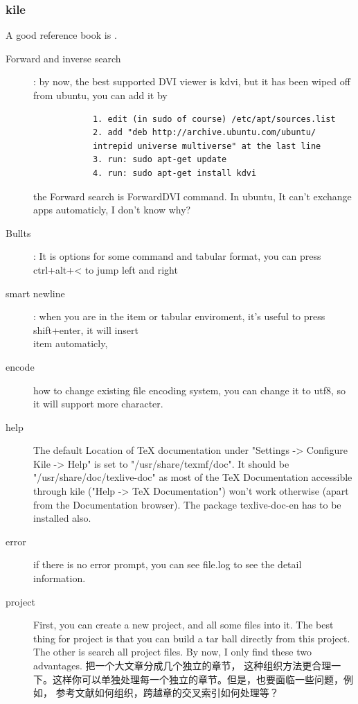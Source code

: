 \documentclass[a4paper,12pt,twoside]{book}
\begin{document}
\begin{CJK*}{UTF8}{song}
	\subsubsection{kile}
		A good reference book is \cite{Kile}.\\
		\begin{description}
			\item[Forward and inverse search]:
			by now, the best supported DVI viewer is kdvi, but it has been wiped off from ubuntu, you can add it by
			\begin{verbatim}
			1. edit (in sudo of course) /etc/apt/sources.list
			2. add "deb http://archive.ubuntu.com/ubuntu/
			intrepid universe multiverse" at the last line
			3. run: sudo apt-get update
			4. run: sudo apt-get install kdvi
			\end{verbatim}
			the Forward search is ForwardDVI command. In ubuntu, It can't exchange apps automaticly, I don't know why?
			\item[Bullts]:
			It is options for some command and tabular format, you can press ctrl+alt+< to jump left and right
			\item[smart newline]:
			when you are in the item or tabular enviroment, it's useful to press shift+enter, it will insert \\item automaticly,
			\item[encode] how to change existing file encoding system, you can change it to utf8, so it will support more character.
			\item[help]
			The default Location of TeX documentation under "Settings -> Configure Kile -> Help" is set to "/usr/share/texmf/doc". It should be "/usr/share/doc/texlive-doc" as most of the TeX Documentation accessible through kile ("Help -> TeX Documentation") won't work otherwise (apart from the Documentation browser). The package texlive-doc-en has to be installed also.
			\item[error]
			if there is no error prompt, you can see file.log to see the detail information.
			\item[project]
			First, you  can create a new project, and all some files into it. The best thing for project is that you can build a tar ball directly from this project. The other is search all project files. By now, I only find these two advantages. 把一个大文章分成几个独立的章节， 这种组织方法更合理一下。这样你可以单独处理每一个独立的章节。但是，也要面临一些问题，例如， 参考文献如何组织，跨越章的交叉索引如何处理等？
		\end{description}
	


\end{CJK*}
\end{document}
